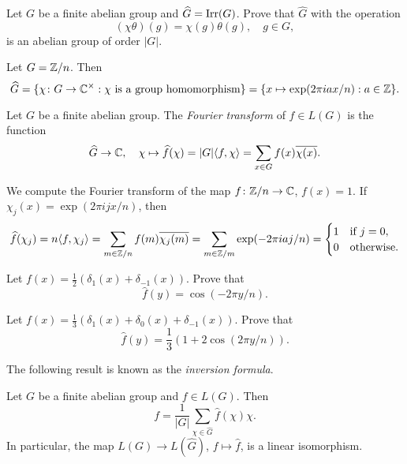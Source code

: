 \begin{exercise}
\label{xca:dual}
	Let $G$ be a finite abelian group and $\widehat{G}=\operatorname{Irr}(G)$. 
    Prove that $\widehat{G}$ with the operation 
    \[
	(\chi\theta)(g)=\chi(g)\theta(g),\quad g\in G,
    \]
    is an abelian group of order $|G|$.
\end{exercise}
 
\begin{example}
  Let $G=\mathbb{Z}/n$. Then
  \[
    \widehat{G}=\{\chi\colon G\to\mathbb{C}^\times:\text{$\chi$ is a group homomorphism}\}=\{x\mapsto \exp(2\pi iax/n):a\in\mathbb{Z}\}.
  \]
\end{example}

\begin{definition}
  Let $G$ be a finite abelian group. The \emph{Fourier 
  transform} of $f\in L(G)$ is the function 
  \[
	\widehat{G}\to\mathbb{C},\quad
	\chi\mapsto\widehat{f}(\chi)
	=|G|\langle f,\chi\rangle=\sum_{x\in G}f(x)\overline{\chi(x)}.
  \]
\end{definition}

\begin{example}
  We compute the Fourier transform of the map
  $f\colon\mathbb{Z}/n\to\mathbb{C}$, $f(x)=1$. If
  $\chi_j(x)=\exp(2\pi ijx/n)$, then 
  \[
	\widehat{f}(\chi_j)=n\langle f,\chi_j\rangle
	=\sum_{m\in\mathbb{Z}/n}f(m)\overline{\chi_j(m)}
	=\sum_{m\in\mathbb{Z}/m}\exp(-2\pi iaj/n)
	=\begin{cases}
	  1 & \text{if $j=0$},\\
	  0 & \text{otherwise}.
	\end{cases}
  \]
\end{example}

\begin{exercise}
    Let $f(x)=\frac12(\delta_1(x)+\delta_{-1}(x))$. Prove that 
    \[
      \widehat{f}(y)=\cos (-2\pi y/n). 
    \]
\end{exercise}

\begin{exercise}
    Let $f(x)=\frac13(\delta_1(x)+\delta_0(x)+\delta_{-1}(x))$. Prove that
    \[
      \widehat{f}(y)=\frac13(1+2\cos(2\pi y/n)). 
    \]
\end{exercise}

The following result is known as the 
\emph{inversion formula}. 

\begin{proposition}
  \label{pro:inversion_abelian}
  Let $G$ be a finite abelian group and $f\in L(G)$. Then 
  \[
    f=\frac{1}{|G|}\sum_{\chi\in\widehat{G}}\widehat{f}(\chi)\chi.
  \]
  In particular, the map $L(G)\to L(\widehat{G})$, 
  $f\mapsto\widehat{f}$, is a linear isomorphism. 
\end{proposition}

